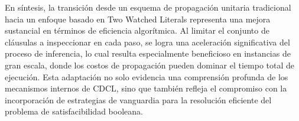 En s\'intesis, la transici\'on desde un esquema de propagaci\'on unitaria tradicional hacia un enfoque basado en Two Watched Literals representa una mejora sustancial en t\'erminos de eficiencia algor\'itmica. Al limitar el conjunto de cl\'ausulas a inspeccionar en cada paso, se logra una aceleraci\'on significativa del proceso de inferencia, lo cual resulta especialmente beneficioso en instancias de gran escala, donde los costos de propagaci\'on pueden dominar el tiempo total de ejecuci\'on. Esta adaptaci\'on no solo evidencia una comprensi\'on profunda de los mecanismos internos de CDCL, sino que tambi\'en refleja el compromiso con la incorporaci\'on de estrategias de vanguardia para la resoluci\'on eficiente del problema de satisfacibilidad booleana.
